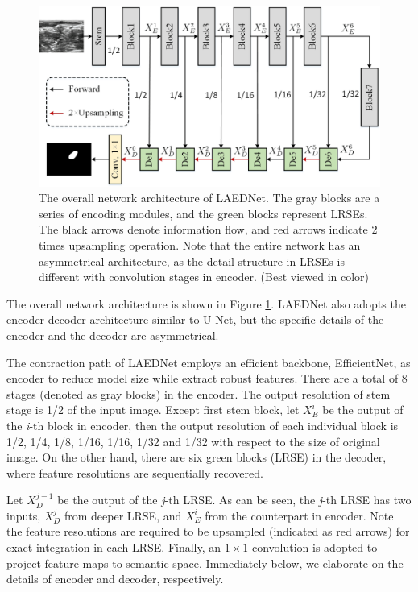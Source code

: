 \documentclass[review]{elsarticle}
\begin{document}
\begin{figure}[!t]
	\includegraphics[width=\textwidth]{overall-architecture.png}
	\caption{The overall network architecture of LAEDNet. The gray blocks are a series of encoding modules, and the green blocks represent LRSEs. The black arrows denote information flow, and red arrows indicate 2 times upsampling operation. Note that the entire network has an asymmetrical architecture, as the detail structure in LRSEs is different with convolution stages in encoder. (Best viewed in color)}
	\label{fig1}
\end{figure}

The overall network architecture is shown in Figure \ref{fig1}. LAEDNet also adopts the encoder-decoder architecture similar to U-Net\cite{2015U}, but the specific details of the encoder and the decoder are asymmetrical.

The contraction path of LAEDNet employs an efficient backbone, EfficientNet\cite{2019EfficientNet}, as encoder to reduce model size while extract robust features. There are a total of 8 stages (denoted as gray blocks) in the encoder. The output resolution of stem stage is 1/2 of the input image. Except first stem block, let $X_{E}^{i}$ be the output of the \emph{i}-th block in encoder, then the output resolution of each individual block is 1/2, 1/4, 1/8, 1/16, 1/16, 1/32 and 1/32 with respect to the size of original image. On the other hand, there are six green blocks (LRSE) in the decoder, where feature resolutions are sequentially recovered.

Let $X_{D}^{j-1}$ be the output of the \emph{j}-th LRSE. As can be seen, the \emph{j}-th LRSE has two inputs, $X_{D}^{j}$ from deeper LRSE, and $X_{E}^{i}$ from the counterpart in encoder. Note the feature resolutions are required to be upsampled (indicated as red arrows) for exact integration in each LRSE. Finally, an $1\times1$ convolution is adopted to project feature maps to semantic space. Immediately below, we elaborate on the details of encoder and decoder, respectively.
\end{document}
